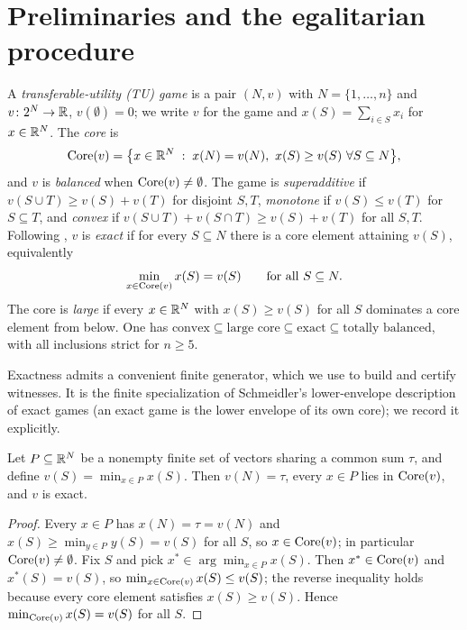 
\section{Preliminaries and the egalitarian procedure}\label{sec:prelim}

A \emph{transferable-utility (TU) game} is a pair $(N,v)$ with $N=\{1,\dots,n\}$
and $v\colon 2^{N}\to\mathbb{R}$, $v(\emptyset)=0$; we write $v$ for the game and
$x(S)=\sum_{i\in S}x_i$ for $x\in\mathbb{R}^{N}$. The \emph{core} is
\[
  \core(v)=\bigl\{x\in\R^{N}\;:\;x(N)=v(N),\ x(S)\ge v(S)\ \forall S\subseteq N\bigr\},
\]
and $v$ is \emph{balanced} when $\operatorname{Core}(v)\neq\emptyset$. The game is
\emph{superadditive} if $v(S\cup T)\ge v(S)+v(T)$ for disjoint $S,T$,
\emph{monotone} if $v(S)\le v(T)$ for $S\subseteq T$, and \emph{convex} if
$v(S\cup T)+v(S\cap T)\ge v(S)+v(T)$ for all $S,T$. Following
\citet{Schmeidler1972}, $v$ is \emph{exact} if for every $S\subseteq N$ there is
a core element attaining $v(S)$, equivalently
\[
  \min_{x\in\operatorname{Core}(v)} x(S)=v(S)\qquad\text{for all }S\subseteq N .
\]
The core is \emph{large} \citep{Sharkey1982} if every $x\in\mathbb{R}^{N}$ with
$x(S)\ge v(S)$ for all $S$ dominates a core element from below. One has
$\text{convex}\subseteq\text{large core}\subseteq\text{exact}\subseteq
\text{totally balanced}$, with all inclusions strict for $n\ge5$.

Exactness admits a convenient finite generator, which we use to build and
certify witnesses. It is the finite specialization of Schmeidler's
lower-envelope description of exact games (an exact game is the lower envelope
of its own core); we record it explicitly.

\begin{lemma}\label{lem:generator}
Let $P\subseteq\mathbb{R}^{N}$ be a nonempty finite set of vectors sharing a common sum
$\tau$, and define $v(S)=\min_{x\in P}x(S)$. Then $v(N)=\tau$, every $x\in P$
lies in $\operatorname{Core}(v)$, and $v$ is exact.
\end{lemma}

\begin{proof}
Every $x\in P$ has $x(N)=\tau=v(N)$ and $x(S)\ge\min_{y\in P}y(S)=v(S)$ for all
$S$, so $x\in\operatorname{Core}(v)$; in particular $\operatorname{Core}(v)\neq\emptyset$. Fix $S$ and pick
$x^{\ast}\in\arg\min_{x\in P}x(S)$. Then $x^{\ast}\in\operatorname{Core}(v)$ and
$x^{\ast}(S)=v(S)$, so $\min_{x\in\operatorname{Core}(v)}x(S)\le v(S)$; the reverse inequality
holds because every core element satisfies $x(S)\ge v(S)$. Hence
$\min_{\operatorname{Core}(v)}x(S)=v(S)$ for all $S$.
\end{proof}

